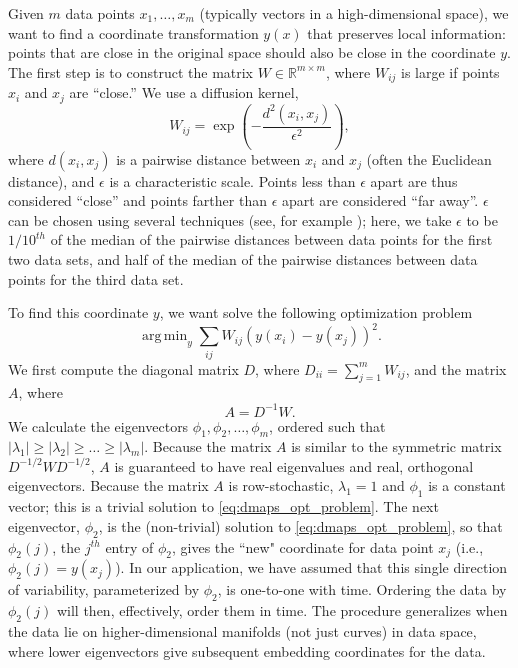\documentclass[12pt]{article}
\DeclareMathOperator*{\argmin}{arg\,min}
\begin{document}
Given $m$ data points $x_1, \dots, x_m$ (typically vectors in a high-dimensional space), we want to find a coordinate transformation $y(x)$ that preserves local information: points that are close in the original space should also be close in the coordinate $y$.
%
The first step is to construct the matrix $W \in \mathbb{R}^{m \times m}$, where $W_{ij}$ is large if points $x_i$ and $x_j$ are ``close.''
%
We use a diffusion kernel,
\begin{equation} \label{eq:dmaps_W}
W_{ij} = \exp \left( -\frac{d^2(x_i, x_j)}{\epsilon^2} \right),
\end{equation}
where $d(x_i, x_j)$ is a pairwise distance between $x_i$ and $x_j$ (often the Euclidean distance), and $\epsilon$ is a characteristic scale.
%
Points less than $\epsilon$ apart are thus considered ``close'' and points farther than $\epsilon$ apart are considered ``far away''.
%
$\epsilon$ can be chosen using several techniques (see, for example \cite{coifman2008graph, rohrdanz2011determination}); here, we take $\epsilon$ to be $1/10^{th}$ of the median of the pairwise distances between data points for the first two data sets, and half of the median of the pairwise distances between data points for the third data set.

To find this coordinate $y$, we want solve the following optimization problem \cite{Belkin2003}
\begin{equation} \label{eq:dmaps_opt_problem}
\argmin_{y} \sum_{ij} W_{ij} (y(x_i) - y(x_j))^2.
\end{equation}
%
We first compute the diagonal matrix $D$, where $D_{ii} = \sum_{j=1}^{m} W_{ij}$, and the matrix $A$, where
\begin{equation} \label{eq:dmaps_A}
A = D^{-1} W.
\end{equation}
%
We calculate the eigenvectors $\phi_1, \phi_2, \dots, \phi_m$, ordered such that $|\lambda_1| \ge |\lambda_2| \ge \dots \ge |\lambda_m|$.
%
Because the matrix $A$ is similar to the symmetric matrix $D^{-1/2} W D^{-1/2}$, $A$ is guaranteed to have real eigenvalues and real, orthogonal eigenvectors.
%
Because the matrix $A$ is row-stochastic, $\lambda_1=1$ and $\phi_1$ is a constant vector; this is a trivial solution to \eqref{eq:dmaps_opt_problem}.
%
%
The next eigenvector, $\phi_2$, is the (non-trivial) solution to \eqref{eq:dmaps_opt_problem}, so that $\phi_2(j)$, the $j^{th}$ entry of $\phi_2$, gives the ``new" coordinate for data point $x_j$ (i.e., $\phi_2(j) = y(x_j)$).
%
In our application, we have assumed that this single direction of variability, parameterized by $\phi_2$, is one-to-one with time.
%
Ordering the data by $\phi_2(j)$ will then, effectively, order them in time.
%
The procedure generalizes when the data lie on higher-dimensional manifolds (not just curves) in data space, where lower eigenvectors give subsequent embedding coordinates for the data. 
\end{document}
